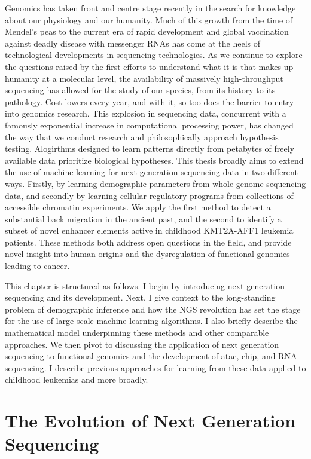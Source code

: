 Genomics has taken front and centre stage recently in the search for knowledge about our physiology and our humanity. Much of this growth from the time of Mendel's peas to the current era of rapid development and global vaccination against deadly disease with messenger RNAs has come at the heels of technological developments in sequencing technologies. As we continue to explore the questions raised by the first efforts to understand what it is that makes up humanity at a molecular level, the availability of massively high-throughput sequencing has allowed for the study of our species, from its history to its pathology. Cost lowers every year, and with it, so too does the barrier to entry into genomics research. This explosion in sequencing data, concurrent with a famously exponential increase in computational processing power, has changed the way that we conduct research and philosophically approach hypothesis testing. Alogirthms designed to learn patterns directly from petabytes of freely available data prioritize biological hypotheses. This thesis broadly aims to extend the use of machine learning for next generation sequencing data in two different ways. Firstly, by learning demographic parameters from whole genome sequencing data, and secondly by learning cellular regulatory programs from collections of accessible chromatin experiments. We apply the first method to detect a substantial back migration in the ancient past, and the second to identify a subset of novel enhancer elements active in childhood KMT2A-AFF1 leukemia patients. These methods both address open questions in the field, and provide novel insight into human origins and the dysregulation of functional genomics leading to cancer.

This chapter is structured as follows. I begin by introducing next generation sequencing and its development. Next, I give context to the long-standing problem of demographic inference and how the NGS revolution has set the stage for the use of large-scale machine learning algorithms. I also briefly describe the mathematical model underpinning these methods and other comparable approaches. We then pivot to discussing the application of next generation sequencing to functional genomics and the development of \gls{atac}, \gls{chip}, and RNA sequencing. I describe previous approaches for learning from these data applied to childhood leukemias and more broadly. 


\section{The Evolution of Next Generation Sequencing}

